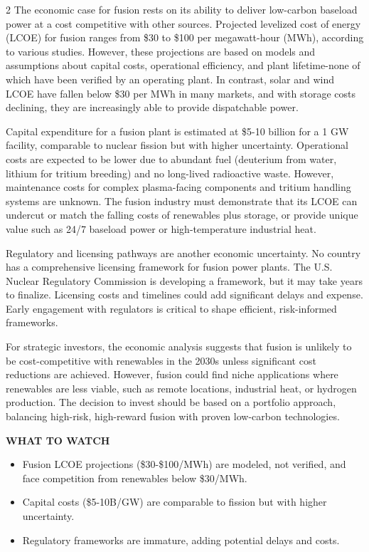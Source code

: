 \documentclass[10pt,a4paper]{article}
\begin{document}
\begin{multicols}{2}
{\small The economic case for fusion rests on its ability to deliver low-carbon baseload power at a cost competitive with other sources. Projected levelized cost of energy (LCOE) for fusion ranges from \$30 to \$100 per megawatt-hour (MWh), according to various studies. However, these projections are based on models and assumptions about capital costs, operational efficiency, and plant lifetime-none of which have been verified by an operating plant. In contrast, solar and wind LCOE have fallen below \$30 per MWh in many markets, and with storage costs declining, they are increasingly able to provide dispatchable power.}\par
{\small Capital expenditure for a fusion plant is estimated at \$5-10 billion for a 1 GW facility, comparable to nuclear fission but with higher uncertainty. Operational costs are expected to be lower due to abundant fuel (deuterium from water, lithium for tritium breeding) and no long-lived radioactive waste. However, maintenance costs for complex plasma-facing components and tritium handling systems are unknown. The fusion industry must demonstrate that its LCOE can undercut or match the falling costs of renewables plus storage, or provide unique value such as 24/7 baseload power or high-temperature industrial heat.}\par
{\small Regulatory and licensing pathways are another economic uncertainty. No country has a comprehensive licensing framework for fusion power plants. The U.S. Nuclear Regulatory Commission is developing a framework, but it may take years to finalize. Licensing costs and timelines could add significant delays and expense. Early engagement with regulators is critical to shape efficient, risk-informed frameworks.}\par
{\small For strategic investors, the economic analysis suggests that fusion is unlikely to be cost-competitive with renewables in the 2030s unless significant cost reductions are achieved. However, fusion could find niche applications where renewables are less viable, such as remote locations, industrial heat, or hydrogen production. The decision to invest should be based on a portfolio approach, balancing high-risk, high-reward fusion with proven low-carbon technologies.}\par
\end{multicols}
\vspace{4pt}\noindent\begin{minipage}{\linewidth}
{\textcolor{BOGreen}{\scriptsize\bfseries WHAT TO WATCH}}\par\vspace{2pt}
{\footnotesize\begin{itemize}
\item Fusion LCOE projections (\$30-\$100/MWh) are modeled, not verified, and face competition from renewables below \$30/MWh.
\item Capital costs (\$5-10B/GW) are comparable to fission but with higher uncertainty.
\item Regulatory frameworks are immature, adding potential delays and costs.
\end{itemize}}
\end{minipage}
\label{chap:2:end}
\end{document}
